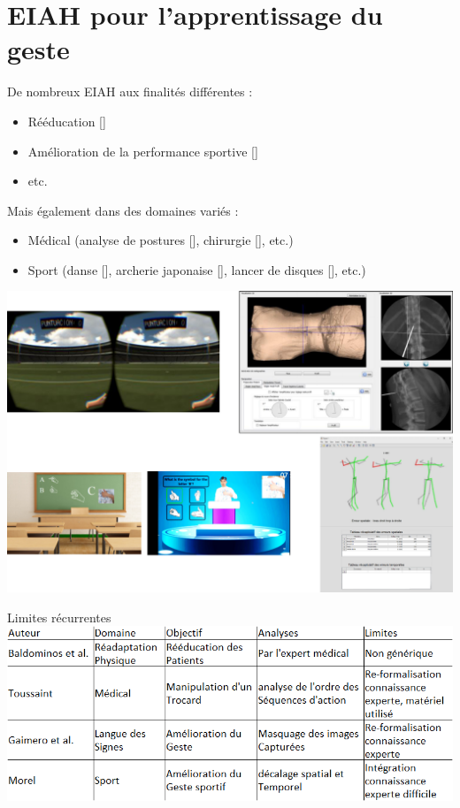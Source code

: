 \documentclass[svgnames]{beamer}
\newcommand{\mycite}[1]{[\textit{\cite{#1}}]}
\begin{document}
	\section{EIAH pour l'apprentissage du geste}
	\begin{frame}{\secname}
		De nombreux EIAH aux finalités différentes :
		\begin{itemize}[label=$\bullet$]
			\item Rééducation \mycite{Alankus2010TCG}
			\item Amélioration de la performance sportive \mycite{Baldominos2015AAt}
			\item etc.
		\end{itemize}
		
		Mais également dans des domaines variés :
		\begin{itemize}[label=$\bullet$]
			\item Médical (analyse de postures \mycite{Aminian2004Chm}, chirurgie \mycite{BMT_2015}, etc.)
			\item Sport (danse \mycite{Maes2012DtM}, archerie japonaise \mycite{Yoshinaga2015Doa}, lancer de disques \mycite{YAMAOKA2013912}, etc.)
		\end{itemize}
	\end{frame}
	
	\begin{frame}{\secname}
		\centering
		\includegraphics[scale=0.3]{img/all_eiah.png}
	\end{frame}
	
	\begin{frame}{Limites récurrentes}
		\centering
		\includegraphics[scale=0.5]{img/tableau_eiah_2.png}
	\end{frame}
	
\end{document}

